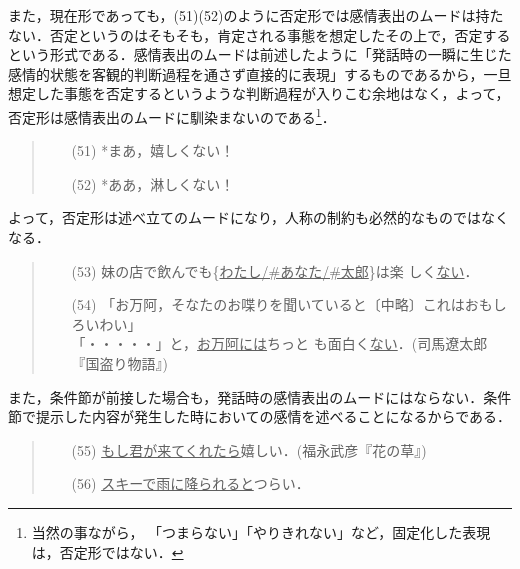 また，現在形であっても，(51)(52)のように否定形では感情表出のムードは持た
ない．否定というのはそもそも，肯定される事態を想定したその上で，否定する
という形式である．感情表出のムードは前述したように「発話時の一瞬に生じた
感情的状態を客観的判断過程を通さず直接的に表現」するものであるから，一旦
想定した事態を否定するというような判断過程が入りこむ余地はなく，よって，
否定形は感情表出のムードに馴染まないのである\footnote{当然の事ながら，
「つまらない」「やりきれない」など，固定化した表現は，否定形ではない．}．

\vspace{0.3cm}
\begin{quote}
\begin{itemize}
 \item[(51)] *まあ，嬉しくない！
 \item[(52)] *ああ，淋しくない！
\end{itemize}
\end{quote}
\vspace{0.3cm}

よって，否定形は述べ立てのムードになり，人称の制約も必然的なものではなく
なる．

\vspace{0.3cm}
\begin{quote}
\begin{itemize}
 \item[(53)] 妹の店で飲んでも\{\underline{わたし/\#あなた/\#太郎}\}は楽
	     しく\underline{ない}．
 \item[(54)] 「お万阿，そなたのお喋りを聞いていると〔中略〕これはおもし
	     ろいわい」\\「・・・・・」と，\underline{お万阿には}ちっと
	     も面白く\underline{ない}．(司馬遼太郎『国盗り物語』)
\end{itemize}
\end{quote}
\vspace{0.3cm}

また，条件節が前接した場合も，発話時の感情表出のムードにはならない．条件
節で提示した内容が発生した時においての感情を述べることになるからである．

\vspace{0.3cm}
\begin{quote}
\begin{itemize}
 \item[(55)] \underline{もし君が来てくれたら}嬉しい．(福永武彦『花の草』)
 \item[(56)] \underline{スキーで雨に降られると}つらい．
\end{itemize}
\end{quote}
\vspace{0.3cm}

